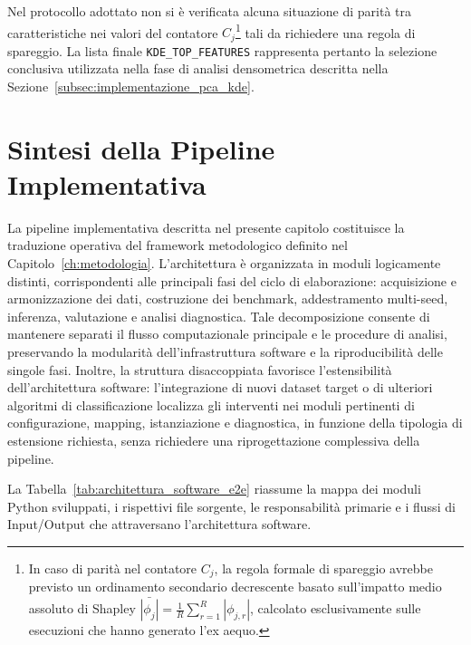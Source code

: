 Nel protocollo adottato non si è verificata alcuna situazione di parità tra caratteristiche nei valori del contatore $C_j$\footnote{In caso di parità nel contatore $C_j$, la regola formale di spareggio avrebbe previsto un ordinamento secondario decrescente basato sull'impatto medio assoluto di Shapley $\bar{|\phi_j|} = \frac{1}{R} \sum_{r=1}^{R} |\phi_{j,r}|$, calcolato esclusivamente sulle esecuzioni che hanno generato l'ex aequo.} tali da richiedere una regola di spareggio. 
La lista finale \texttt{KDE\_TOP\_FEATURES} rappresenta pertanto la selezione conclusiva utilizzata nella fase di analisi densometrica descritta nella Sezione~\ref{subsec:implementazione_pca_kde}.


\section{Sintesi della Pipeline Implementativa}
\label{sec:sintesi_pipeline_implementativa}
 
La pipeline implementativa descritta nel presente capitolo costituisce la traduzione operativa del framework metodologico definito nel Capitolo~\ref{ch:metodologia}.
L'architettura è organizzata in moduli logicamente distinti, corrispondenti alle principali fasi del ciclo di elaborazione: acquisizione e armonizzazione dei dati, costruzione dei benchmark, addestramento multi-seed, inferenza, valutazione e analisi diagnostica.
Tale decomposizione consente di mantenere separati il flusso computazionale principale e le procedure di analisi, preservando la modularità dell'infrastruttura software e la riproducibilità delle singole fasi.
Inoltre, la struttura disaccoppiata favorisce l'estensibilità dell'architettura software: l'integrazione di nuovi dataset target o di ulteriori algoritmi di classificazione localizza gli interventi nei moduli pertinenti di configurazione, mapping, istanziazione e diagnostica, in funzione della tipologia di estensione richiesta, senza richiedere una riprogettazione complessiva della pipeline.
 
La Tabella~\ref{tab:architettura_software_e2e} riassume la mappa dei moduli Python sviluppati, i rispettivi file sorgente, le responsabilità primarie e i flussi di Input/Output che attraversano l'architettura software.
 
\newpage
 
